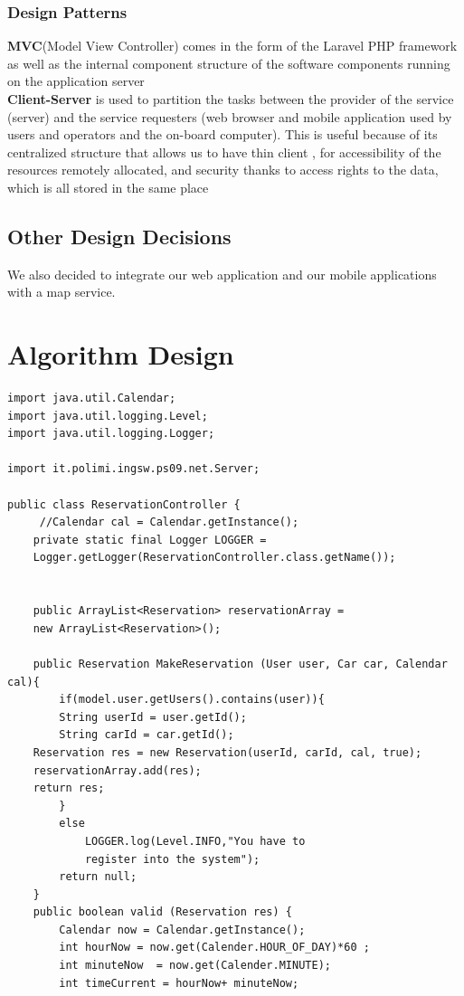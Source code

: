 \documentclass{article}
\begin{document}
\begin{flushleft}
\begin{itemize}
\end{itemize} 
\vspace{1cm}



\subsubsection{Design Patterns}

\textbf{MVC}(Model View Controller) comes in the form of the Laravel PHP framework as well as the internal component structure of the software components running on the application server\\
\textbf{Client-Server}  is used to partition the tasks between the provider of the service (server) and the service requesters (web browser and mobile application used by users and operators and the on-board computer). This is useful because of its centralized structure that allows us to have thin client , for accessibility of the resources remotely allocated, and security  thanks to access rights to the data, which is all stored in the same place


\subsection{Other Design Decisions} %
We also decided to integrate our web application and our mobile applications with a map service.

\section{Algorithm Design} %
\begin{lstlisting}
import java.util.Calendar;
import java.util.logging.Level;
import java.util.logging.Logger;

import it.polimi.ingsw.ps09.net.Server;

public class ReservationController {
	 //Calendar cal = Calendar.getInstance();
	private static final Logger LOGGER = 
	Logger.getLogger(ReservationController.class.getName());
    
	
	public ArrayList<Reservation> reservationArray = 
	new ArrayList<Reservation>();
	
	public Reservation MakeReservation (User user, Car car, Calendar cal){
		if(model.user.getUsers().contains(user)){
		String userId = user.getId();
		String carId = car.getId();
	Reservation res = new Reservation(userId, carId, cal, true);
	reservationArray.add(res);
	return res;
		}
		else 
			LOGGER.log(Level.INFO,"You have to 
			register into the system");
		return null;
	}
	public boolean valid (Reservation res) {
		Calendar now = Calendar.getInstance();
		int hourNow = now.get(Calender.HOUR_OF_DAY)*60 ;
		int minuteNow  = now.get(Calender.MINUTE);
		int timeCurrent = hourNow+ minuteNow;
		

\end{lstlisting}
\end{flushleft}
\end{document}

